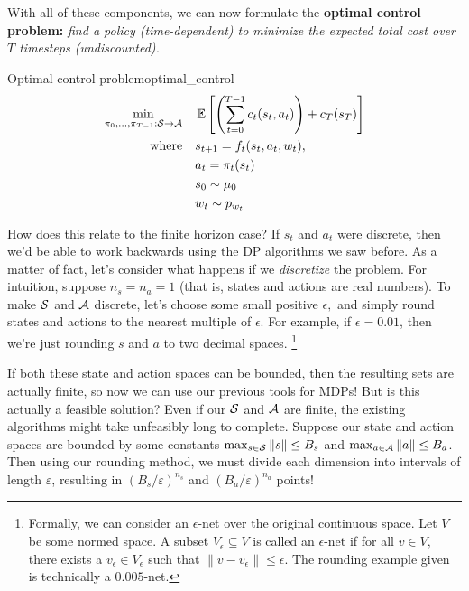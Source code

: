 \documentclass[../main/main]{subfiles}
\begin{document}
With all of these components, we can now formulate the \textbf{optimal control problem:} \emph{find a policy (time-dependent) to minimize the expected total cost over $T$ timesteps (undiscounted).}

\begin{definition}{Optimal control problem}{optimal_control}
    \begin{equation}
        \begin{split}
            \min_{\pi_0, \dots, \pi_{T-1} : \mathcal{S} \to \mathcal{A}} \quad & \operatorname*{\mathbb{E}} \left[
                \left( \sum_{t=0}^{T-1} c_t(s_t, a_t) \right) + c_T(s_T)
            \right] \\
            \text{where} \quad & s_{t+1} = f_t(s_t, a_t, w_t), \\
            & a_t = \pi_t(s_t) \\
            & s_0 \sim \mu_0 \\
            & w_t \sim p_{w_t}
        \end{split}
    \end{equation}
\end{definition}


How does this relate to the finite horizon case?
If $s_t$ and $a_t$ were discrete, then we'd be able to work backwards using
the DP algorithms we saw before.
As a matter of fact, let's consider what happens if we \emph{discretize} the
problem. For intuition, suppose $n_s = n_a = 1$ (that is, states and actions are real numbers).
To make $\mathcal{S}$ and $\mathcal{A}$ discrete, let's choose some small positive $\epsilon,$
and simply round states and actions to the nearest multiple of
$\epsilon.$ For example, if $\epsilon = 0.01$, then we're just rounding $s$ and $a$ to two decimal spaces. \footnote{Formally, we can consider an $\epsilon$-net over the original continuous space. Let $V$ be some normed space. A subset $V_\epsilon \subseteq V$ is called an $\epsilon$-net if for all $v \in V,$ there exists a $v_\epsilon \in V_\epsilon$ such that $\|v - v_\epsilon\| \le \epsilon.$ The rounding example given is technically a $0.005$-net.}

If both these state and action spaces can be bounded, then the resulting
sets are actually finite, so now we can use our previous tools for MDPs!
But is this actually a feasible solution? Even if our $\mathcal{S}$ and $\mathcal{A}$ are
finite, the existing algorithms might take unfeasibly long to complete.
Suppose our state and action spaces
are bounded by some constants $\max_{s \in \mathcal{S}} \|s\| \le B_s$ and
$\max_{a \in \mathcal{A}} \|a\| \le B_a$.
Then using our rounding method, we must divide each dimension into intervals of length $\varepsilon$,
resulting in $(B_s/\varepsilon)^{n_s}$ and $(B_a/\varepsilon)^{n_a}$ points!
\end{document}
